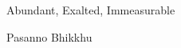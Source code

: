 \thispagestyle{empty}

\vspace*{1.75in}
{\center\titlefont\LARGE
Abundant, Exalted, Immeasurable

\vspace{.5in}\Large
Pasanno Bhikkhu

}

\clearpage
